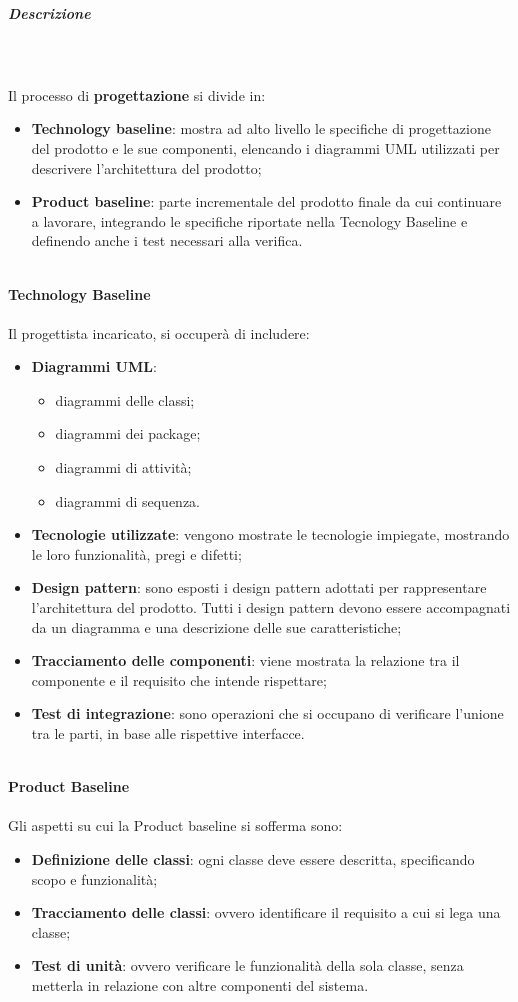 		\subparagraph*{Descrizione} \mbox{} \\ \mbox{} \\
		Il processo di \textbf{progettazione} si divide in:
			\begin{itemize}
				\item \textbf{Technology baseline}: mostra ad alto livello le specifiche di progettazione del prodotto e le sue componenti, elencando i diagrammi UML utilizzati per descrivere l'architettura del prodotto;
				\item \textbf{Product baseline}: parte incrementale del prodotto finale da cui continuare a lavorare, integrando le specifiche riportate nella Tecnology Baseline e  definendo anche i test necessari alla verifica.
			\end{itemize} 
			\mbox{} \\
			\textbf{Technology Baseline} \mbox{} \\ \mbox{} \\
			Il progettista incaricato, si occuperà di includere:
			\begin{itemize}
				\item \textbf{Diagrammi UML}:
				\begin{itemize}
					\item diagrammi delle classi;
					\item diagrammi dei package;
					\item diagrammi di attività;
					\item diagrammi di sequenza.
				\end{itemize}
				\item \textbf{Tecnologie utilizzate}: vengono mostrate le tecnologie impiegate, mostrando le loro funzionalità, pregi e difetti;
				\item \textbf{Design pattern}\glo : sono esposti i design pattern adottati per rappresentare l'architettura del prodotto. Tutti i design pattern devono essere accompagnati da un diagramma e una descrizione delle sue caratteristiche;
				\item \textbf{Tracciamento delle componenti}: viene mostrata la relazione tra il componente e il requisito che intende rispettare; 
				\item \textbf{Test di integrazione}: sono operazioni che si occupano di verificare l'unione tra le parti, in base alle rispettive interfacce.
			\end{itemize}
			\mbox{} \\
			\textbf{Product Baseline} \mbox{} \\ \mbox{} \\
			Gli aspetti su cui la  Product baseline si sofferma sono:
				\begin{itemize}
					\item \textbf{Definizione delle classi}: ogni classe deve essere descritta, specificando scopo e funzionalità;
					\item \textbf{Tracciamento delle classi}: ovvero identificare il requisito a cui si lega una classe;
					\item \textbf{Test di unità}: ovvero verificare le funzionalità della sola classe, senza metterla in relazione con altre componenti del sistema.
				\end{itemize}
